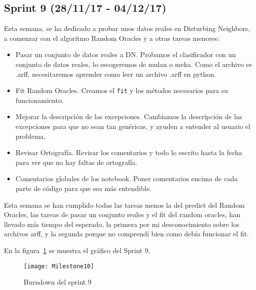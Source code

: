 \subsection{Sprint 9 (28/11/17 - 04/12/17)}
Esta semana, se ha dedicado a probar unos datos reales en Disturbing Neighbors, a comenzar con el algoritmo Random Oracles y a otras tareas menores:
\begin{itemize}
\item Pasar un conjunto de datos reales a DN. Probamos el clasificador con un conjunto de datos reales, lo escogeremos de mulan o meka. Como el archivo es .arff, necesitaremos aprender como leer un archivo .arff en python.
\item Fit Random Oracles. Creamos el \texttt{fit} y los métodos necesarios para su funcionamiento.
\item Mejorar la descripción de las excepciones. Cambiamos la descripción de las excepciones para que no sean tan genéricas, y ayuden a entender al usuario el problema.
\item Revisar Ortografía. Revisar los comentarios y todo lo escrito hasta la fecha para ver que no hay faltas de ortografía.
\item Comentarios globales de los notebook. Poner comentarios encima de cada parte de código para que sea más entendible.
\end{itemize}

Esta semana se han cumplido todas las tareas menos la del predict del Random Oracles, las tareas de pasar un conjunto reales y el fit del random oracles, han llevado más tiempo del esperado, la primera por mi desconocimiento sobre los archivos arff, y la segunda porque no comprendí bien como debía funcionar el fit.

En la figura~\ref{fig:Milestone10} se muestra el gráfico del Sprint 9.

\begin{figure}
\centering
\texttt{[image: Milestone10]}
\caption{Burndown del sprint 9}
\label{fig:Milestone10}
\end{figure}

